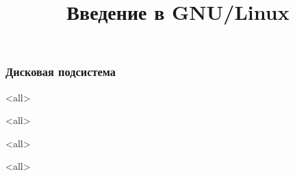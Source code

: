 

\title{Введение в GNU/Linux}








\begin{frame}
	\frametitle{Дисковая подсистема}
	\titlepage
	\vspace{-0.5cm}
	\begin{center}
	\end{center}
\end{frame}
\begin{frame}
	\tableofcontents
\end{frame}


\mode<all>{}

\mode<all>{}

\mode<all>{}

\mode<all>{}



